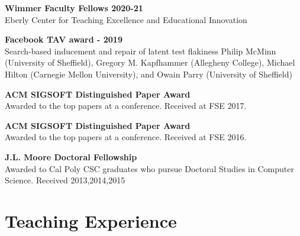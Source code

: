 \documentclass[10pt]{article}
\begin{document}
\textbf{Wimmer Faculty Fellows 2020-21}\\
Eberly Center for Teaching Excellence and Educational Innovation


\textbf{Facebook TAV award - 2019}\\
Search-based inducement and repair of latent test flakiness
Philip McMinn (University of Sheffield), Gregory M. Kapfhammer (Allegheny College), Michael Hilton (Carnegie Mellon University), and Owain Parry (University of Sheffield)

\textbf{ACM SIGSOFT Distinguished Paper Award}\\
Awarded to the top papers at a conference. Received at FSE 2017.

\textbf{ACM SIGSOFT Distinguished Paper Award}\\
Awarded to the top papers at a conference. Received at FSE 2016.

\textbf{J.L. Moore Doctoral Fellowship}  \\
Awarded to Cal Poly CSC graduates who pursue Doctoral Studies in Computer Science. Received 2013,2014,2015



%
%
%





\section{Teaching Experience}
\end{document}
